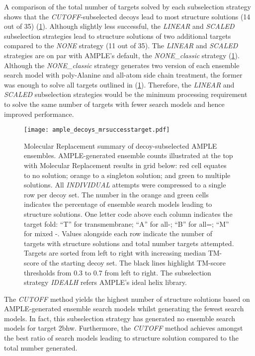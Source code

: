 A comparison of the total number of targets solved by each subselection strategy shows that the \textit{CUTOFF}-subselected decoys lead to most structure solutions (14 out of 35) (\cref{fig:ample_decoys_mrsuccesstarget}). Although slightly less successful, the \textit{LINEAR} and \textit{SCALED} subselection strategies lead to structure solutions of two additional targets compared to the \textit{NONE} strategy (11 out of 35). The \textit{LINEAR} and \textit{SCALED} strategies are on par with AMPLE's default, the \textit{NONE\_classic} strategy (\cref{fig:ample_decoys_mrsuccesstarget}). Although the \textit{NONE\_classic} strategy generates two version of each ensemble search model with poly-Alanine and all-atom side chain treatment, the former was enough to solve all targets outlined in (\cref{fig:ample_decoys_mrsuccesstarget}). Therefore, the \textit{LINEAR} and \textit{SCALED} subselection strategies would be the minimum processing requirement to solve the same number of targets with fewer search models and hence improved performance.

\begin{figure}[H]
    \centering
    \texttt{[image: ample\_decoys\_mrsuccesstarget.pdf]}
\caption[Molecular Replacement summary of decoy-subselected AMPLE ensembles]{Molecular Replacement summary of decoy-subselected AMPLE ensembles. AMPLE-generated ensemble counts illustrated at the top with Molecular Replacement results in grid below: red cell equates to no solution; orange to a singleton solution; and green to multiple solutions. All \textit{INDIVIDUAL} attempts were compressed to a single row per decoy set. The number in the orange and green cells indicates the percentage of ensemble search models leading to structure solutions. One letter code above each column indicates the target fold: ``T'' for transmembrane; ``A'' for all-\textalpha; ``B'' for all=\textbeta; ``M'' for mixed \textalpha-\textbeta. Values alongside each row indicate the number of targets with structure solutions and total number targets attempted. Targets are sorted from left to right with increasing median TM-score of the starting decoy set. The black lines highlight TM-score thresholds from 0.3 to 0.7 from left to right. The subselection strategy \textit{IDEALH} refers AMPLE's ideal helix library.}
    \label{fig:ample_decoys_mrsuccesstarget}
\end{figure}

The \textit{CUTOFF} method yields the highest number of structure solutions based on AMPLE-generated ensemble search models whilst generating the fewest search models. In fact, this subselection strategy has generated no ensemble search models for target 2bhw. Furthermore, the \textit{CUTOFF} method achieves amongst the best ratio of search models leading to structure solution compared to the total number generated. 

